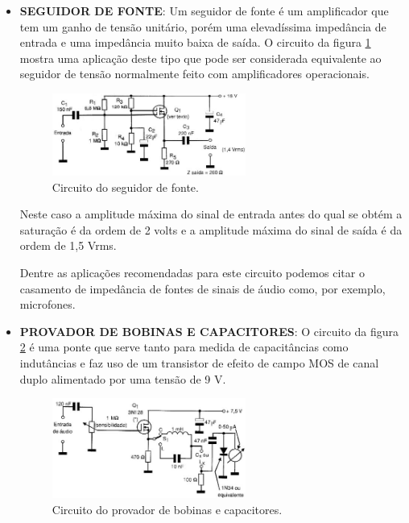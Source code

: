 \documentclass[12pt]{article}
\begin{document}
\begin{itemize}
                \item \textbf{SEGUIDOR DE FONTE}: Um seguidor de fonte é um amplificador que tem um ganho de tensão unitário, porém uma elevadíssima impedância de entrada e uma impedância muito baixa de saída. O circuito da figura \ref{fig:seguidor} mostra uma aplicação deste tipo que pode ser considerada equivalente ao seguidor de tensão normalmente feito com amplificadores operacionais.
                
                    \begin{figure}[htpb!]
                        
                        \centering
                        \includegraphics[width=0.6\textwidth]{./images/Seguidor de fonte.jpg}
                        \caption{Circuito do seguidor de fonte.}
                        \label{fig:seguidor}

                    \end{figure}

                Neste caso a amplitude máxima do sinal de entrada antes do qual se obtém a saturação é da ordem de 2 volts e a amplitude máxima do sinal de saída é da ordem de 1,5 Vrms.

                Dentre as aplicações recomendadas para este circuito podemos citar o casamento de impedância de fontes de sinais de áudio como, por exemplo, microfones.

                \item \textbf{PROVADOR DE BOBINAS E CAPACITORES}: O circuito da figura \ref{fig:provador} é uma ponte que serve tanto para medida de capacitâncias como indutâncias e faz uso de um transistor de efeito de campo MOS de canal duplo alimentado por uma tensão de 9 V.
            
                    \begin{figure}[htpb!]
                        
                        \centering
                        \includegraphics[width=0.6\textwidth]{./images/Provador de bobinas e capacitores.jpg}
                        \caption{Circuito do provador de bobinas e capacitores.}
                        \label{fig:provador}


\end{figure}
\end{itemize}
\end{document}
